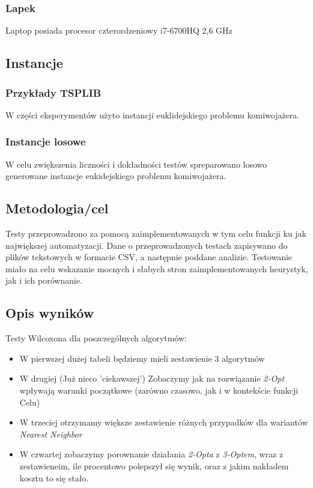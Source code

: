 \documentclass{article}
\begin{document}
\subsubsection{Lapek}
Laptop posiada procesor czterordzeniowy i7-6700HQ 2,6 GHz

\subsection{Instancje}
\subsubsection{Przykłady TSPLIB}
W części eksperymentów użyto instancji euklidejskiego problemu komiwojażera.

\subsubsection{Instancje losowe}
W celu zwiększenia liczności i dokładności testów spreparowano losowo generowane instancje eukidejskiego problemu komiwojażera.

\subsection{Metodologia/cel}

Testy przeprowadzono za pomocą zaimplementowanych w tym celu funkcji ku jak największej automatyzacji. Dane o przeprowadzonych testach zapisywano do plików tekstowych w formacie CSV, a następnie poddane analizie. Testowanie miało na celu wskazanie mocnych i słabych stron zaimplementowanych heurystyk, jak i ich porównanie.

\subsection{Opis wyników}
Testy Wilcoxona dla poszczególnych algorytmów:
\begin{itemize}
	\item W pierwszej dużej tabeli będziemy mieli zestawienie 3 algorytmów
	\item W drugiej (Już nieco 'ciekawszej') Zobaczymy jak na rozwiązanie \textit{2-Opt} wpływają warunki początkowe (zarówno czasowo, jak i w kontekście funkcji Celu)
	\item W trzeciej otrzymamy większe zestawienie różnych przypadków dla wariantów \textit{Nearest Neighbor}
	\item W czwartej zobaczymy porownanie działania \textit{2-Opta} z \textit{3-Optem}, wraz z zestawieneim, ile procentowo polepszył się wynik, oraz z jakim nakładem kosztu to się stało.
\end{itemize}
\end{document}
